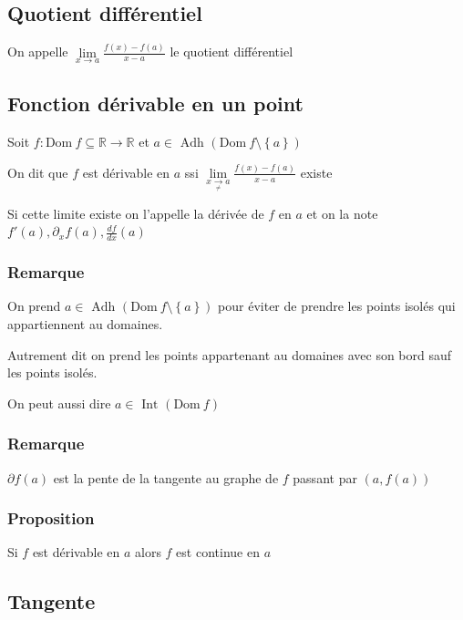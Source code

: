 \documentclass[a4paper,10pt]{article}
\newcommand{\Adh}{\mbox{ Adh }}
\newcommand{\Int}{\mbox{ Int }}
\newcommand{\ap}{\rightarrow}
\newcommand{\Dom}{\mathrm{Dom}\:}
\newcommand{\R}{\mathbb{R}}
\newcommand{\tset}[1]{\left\lbrace #1 \right\rbrace}
\newcommand{\conv}[1]{\mathop{\longrightarrow}\limits_{#1}}
\newcommand{\clim}[1]{\lim\limits_{#1}}
\newcommand{\but}{\setminus}
\begin{document}
\subsection{Quotient différentiel}

On appelle $\clim{x \ap a} \frac{f(x) - f(a)}{x -a}$ le quotient différentiel

\subsection{Fonction dérivable en un point}

Soit $f : \Dom f \subseteq \R \ap \R$ et $a \in \Adh ( \Dom f \but \tset{a} )$

On dit que $f$ est dérivable en $a$ ssi $\clim{x \conv{\neq} a} \frac{f(x) - f(a)}{x-a}$ existe

Si cette limite existe on l'appelle la dérivée de $f$ en $a$ et on la note $f'(a), \partial_x f(a) , \frac{df}{dx}(a)$

\subsubsection{Remarque}

On prend $a \in \Adh(\Dom f \but \tset{a})$ pour éviter de prendre les points isolés qui appartiennent au domaines.

Autrement dit on prend les points appartenant au domaines avec son bord sauf les points isolés.

On peut aussi dire $a \in \Int (\Dom f)$

\subsubsection{Remarque}

$\partial f(a)$ est la pente de la tangente au graphe de $f$ passant par $(a,f(a))$

\subsubsection{Proposition}

Si $f$ est dérivable en $a$ alors $f$ est continue en $a$

\subsection{Tangente}
\end{document}
